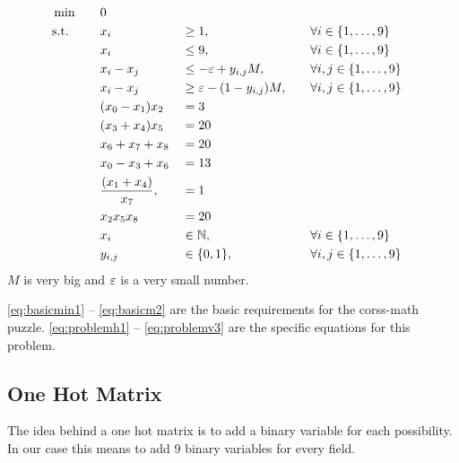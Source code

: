 \documentclass[parskip=half]{scrartcl}
\newcommand{\onetonine}{\{1,\ldots,9\}}
\renewcommand{\epsilon}{\ensuremath\varepsilon}
\begin{document}
\begin{align}
&\min \quad &&0 \\
& \text{s.t.} \quad 
  && x_i 			&&\geq 1 		,&&\quad \forall i \in \onetonine \label{eq:basicmin1} \\
& && x_i 			&&\leq 9  		,&&\quad \forall i \in \onetonine \label{eq:basicmax9} \\
& && x_i - x_j 	&&\leq -\epsilon + y_{i,j} M ,&& \quad \forall i,j \in \onetonine \label{eq:basicm1}\\
& && x_i - x_j 	&&\geq \epsilon - (1-y_{i,j}) M ,&& \quad \forall i,j \in \onetonine \label{eq:basicm2}\\
& && (x_0 - x_1) x_2  &&= 3 \label{eq:problemh1} \\
& && (x_3 + x_4) x_5  &&= 20 \label{eq:problemh2} \\
& && x_6  + x_7 + x_8 &&= 20 \label{eq:problemh3} \\
& && x_0 - x_3 + x_6  &&= 13 \label{eq:problemv1} \\
& && \frac{(x_1 + x_4)}{x_7} ,&&= 1 \label{eq:problemv2} \\
& && x_2  x_5  x_8 &&= 20 \label{eq:problemv3} \\
& && x_i 		&&\in \mathbb{N}  ,&& \quad \forall i \in \onetonine \\
& && y_{i,j} 		&&\in \{0,1\} ,&& \quad \forall i,j \in \onetonine \\
\end{align}
$M$ is very big and $\epsilon$ is a very small number.

\autoref{eq:basicmin1} -- \autoref{eq:basicm2} are the basic requirements for the corss-math puzzle. \autoref{eq:problemh1} -- \autoref{eq:problemv3} are the specific equations for this problem.
\pagebreak
\subsection{One Hot Matrix}

The idea behind a one hot matrix is to add a binary variable for each possibility. In our case this means to add 9 binary variables for every field.
\end{document}
